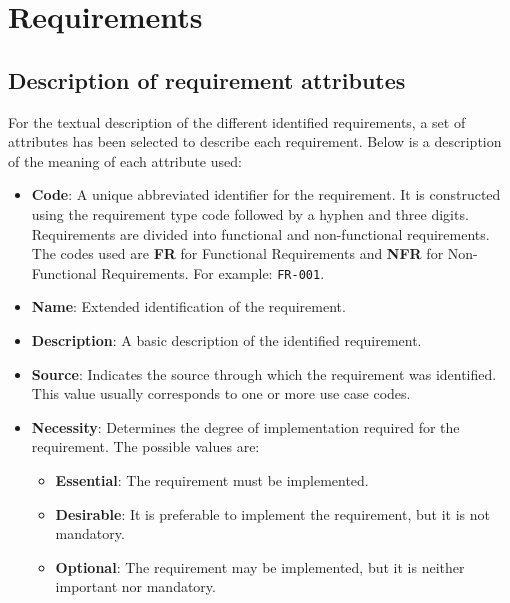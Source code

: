 \section{Requirements}
\label{sec:requirements}

\subsection{Description of requirement attributes}

For the textual description of the different identified requirements, a set of attributes has been
selected to describe each requirement. Below is a description of the meaning of each attribute
used:

\begin{itemize}
    \item \textbf{Code}: A unique abbreviated identifier for the requirement. It is constructed using the requirement type code followed by a hyphen and three digits. Requirements are divided into functional and non-functional requirements. The codes used are \textbf{FR} for Functional Requirements and \textbf{NFR} for Non-Functional Requirements. For example: \texttt{FR-001}.

    \item \textbf{Name}: Extended identification of the requirement.

    \item \textbf{Description}: A basic description of the identified requirement.

    \item \textbf{Source}: Indicates the source through which the requirement was identified. This value usually corresponds to one or more use case codes.

    \item \textbf{Necessity}: Determines the degree of implementation required for the requirement. The possible values are:
          \begin{itemize}
              \item \textbf{Essential}: The requirement must be implemented.
              \item \textbf{Desirable}: It is preferable to implement the requirement, but it is not mandatory.
              \item \textbf{Optional}: The requirement may be implemented, but it is neither important nor mandatory.
          \end{itemize}


\end{itemize}
